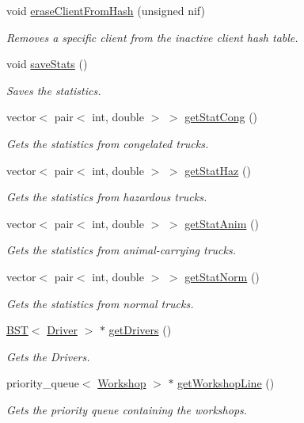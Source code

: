 \begin{DoxyCompactItemize}
void \hyperlink{class_company_aab30d8d03d868006bb277fc8ead1c510}{erase\+Client\+From\+Hash} (unsigned nif)
\begin{DoxyCompactList}\small\item\em Removes a specific client from the inactive client hash table. \end{DoxyCompactList}\item 
void \hyperlink{class_company_aa5b12f509c71984f7346b14cff38ea50}{save\+Stats} ()
\begin{DoxyCompactList}\small\item\em Saves the statistics. \end{DoxyCompactList}\item 
vector$<$ pair$<$ int, double $>$ $>$ \hyperlink{class_company_a46ae11a39256db9dbf2941c58df579c5}{get\+Stat\+Cong} ()
\begin{DoxyCompactList}\small\item\em Gets the statistics from congelated trucks. \end{DoxyCompactList}\item 
vector$<$ pair$<$ int, double $>$ $>$ \hyperlink{class_company_aa37fd8b5214cc269f8f1a0d9b23d2c61}{get\+Stat\+Haz} ()
\begin{DoxyCompactList}\small\item\em Gets the statistics from hazardous trucks. \end{DoxyCompactList}\item 
vector$<$ pair$<$ int, double $>$ $>$ \hyperlink{class_company_af7e04162aac8a1057d2563e211e67460}{get\+Stat\+Anim} ()
\begin{DoxyCompactList}\small\item\em Gets the statistics from animal-\/carrying trucks. \end{DoxyCompactList}\item 
vector$<$ pair$<$ int, double $>$ $>$ \hyperlink{class_company_aec149faa3a58555957f83df920897253}{get\+Stat\+Norm} ()
\begin{DoxyCompactList}\small\item\em Gets the statistics from normal trucks. \end{DoxyCompactList}\item 
\hyperlink{class_b_s_t}{B\+ST}$<$ \hyperlink{class_driver}{Driver} $>$ $\ast$ \hyperlink{class_company_ac53325e1c17389979293dbc78398dc31}{get\+Drivers} ()
\begin{DoxyCompactList}\small\item\em Gets the Drivers. \end{DoxyCompactList}\item 
priority\+\_\+queue$<$ \hyperlink{class_workshop}{Workshop} $>$ $\ast$ \hyperlink{class_company_a339f3025b003f464ffd058d5dbdf43e2}{get\+Workshop\+Line} ()
\begin{DoxyCompactList}\small\item\em Gets the priority queue containing the workshops. \end{DoxyCompactList}\end{DoxyCompactItemize}
